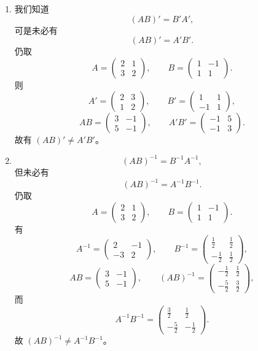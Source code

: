 \begin{enumerate}
\item 我们知道
\[
 (AB)'=B'A',
\]
可是未必有
\[
 (AB)'=A'B'.
\]
仍取
\[
 A=\begin{pmatrix}2&1\\3&2\end{pmatrix},\qquad
 B=\begin{pmatrix}1&-1\\1&1\end{pmatrix}.
\]
则
\[
 A'=\begin{pmatrix}2&3\\1&2\end{pmatrix},\qquad
 B'=\begin{pmatrix}1&1\\-1&1\end{pmatrix},
\]
\[
 AB=\begin{pmatrix}3&-1\\5&-1\end{pmatrix},\qquad
 A'B'=\begin{pmatrix}-1&5\\-1&3\end{pmatrix}.
\]
故有 $(AB)'\ne A'B'$。

\item
\[
 (AB)^{-1}=B^{-1}A^{-1},
\]
但未必有
\[
 (AB)^{-1}=A^{-1}B^{-1}.
\]
仍取
\[
 A=\begin{pmatrix}2&1\\3&2\end{pmatrix},\qquad
 B=\begin{pmatrix}1&-1\\1&1\end{pmatrix}.
\]
有
\[
 A^{-1}=\begin{pmatrix}2&-1\\-3&2\end{pmatrix},\qquad
 B^{-1}=\begin{pmatrix}\frac12&\frac12\\-\frac12&\frac12\end{pmatrix},
\]
\[
 AB=\begin{pmatrix}3&-1\\5&-1\end{pmatrix},\qquad
 (AB)^{-1}=\begin{pmatrix}-\frac12&\frac12\\-\frac52&\frac32\end{pmatrix},
\]
而
\[
 A^{-1}B^{-1}=\begin{pmatrix}\frac32&\frac12\\-\frac52&-\frac12\end{pmatrix}.
\]
故 $(AB)^{-1}\ne A^{-1}B^{-1}$。


\end{enumerate}
